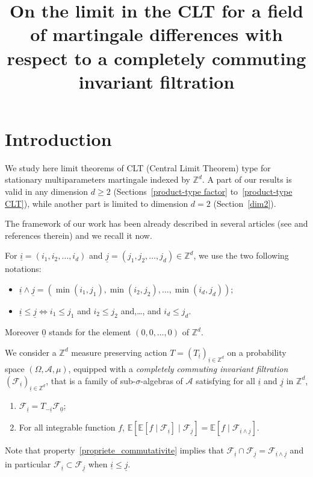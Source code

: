 \documentclass[AHL,Unicode,longabstracts,published]{cedram}
\title[On the limit in the CLT for a field of martingale differences]{On the limit in the CLT for a field of martingale differences with respect to a completely commuting invariant filtration}
\author[\initial{D.} \lastname{Giraudo}]{\firstname{Davide} \lastname{Giraudo}}
\author[\initial{E.} \lastname{Lesigne}]{\firstname{Emmanuel} \lastname{Lesigne}}
\author[\initial{D.} \lastname{Voln\'y}]{\firstname{Dalibor} \lastname{Voln\'y}}
\newcommand{\Z}{\mathbb{Z}}
\newcommand{\bbE}{\mathbb{E}}
\newcommand*\A{\mathcal{A}}
\newcommand*\F{\mathcal{F}}
\begin{document}
\maketitle

\section{Introduction}\label{introduction}

We study here limit theorems of CLT (Central Limit Theorem) type for stationary multiparameters martingale indexed by $\Z^d$. {A part of our results is valid in any dimension $d\geq2$ (Sections~\ref{product-type factor} to~\ref{product-type CLT}), while another part is limited to dimension $d=2$ (Section~\ref{dim2}).}

The framework of our work has been already described in several articles (see \cite{MR3913270} and references therein) and we recall it now.

For $\underline{i}=(i_1,i_2,\dots,i_d)$ and $\underline{j}=(j_1,j_2,\dots,j_d)\in
\Z^d$, we use the two following notations:
\begin{itemize}
\item $\underline{i}\wedge\underline{j}=(\min(i_1,j_1),\min(i_2,j_2),\dots,
\min(i_d,j_d))$;
\item
$\underline{i}\leq\underline{j}\Leftrightarrow i_1\leq j_1$ and $i_2\leq j_2$ and,\dots, and $i_d\leq j_d$.
\end{itemize}
Moreover $\underline{0}$ stands for the element $(0,0,\dots,0)$ of $\Z^d$.


We consider a $\Z^d$ measure preserving action $T=(T_{\underline{i}})_{\underline{i}\in\Z^d}$ on a probability space $(\Omega,\A,\mu)$, equipped with a \emph{completely commuting invariant filtration} $(\F_{\underline{i}})_{\underline{i}\in\Z^d}$, that is a family of sub-$\sigma$-algebras of $\A$ satisfying for all $\underline{i}$ and $\underline{j}$ in $\Z^d$,
\begin{enumerate}
\item \label{propriete_invariante}
$\F_{\underline{i}}=T_{-\underline{i}}\F_{\underline{0}}$;
\item\label{propriete_commutativite}
For all integrable function $f$, $\bbE[\bbE[f\mid\F_{\underline{i}}]\mid\F_{\underline{j}}]=\bbE[f\mid\F_{\underline{i}\wedge\underline{j}}]$.
\end{enumerate}
Note that property~\eqref{propriete_commutativite} implies that $\F_{\underline{i}}\cap\F_{\underline{j}}=\F_{\underline{i}\wedge\underline{j}}$ and in particular $\F_{\underline{i}}\subset\F_{\underline{j}}$ when $\underline{i}\leq \underline{j}$.
\end{document}
